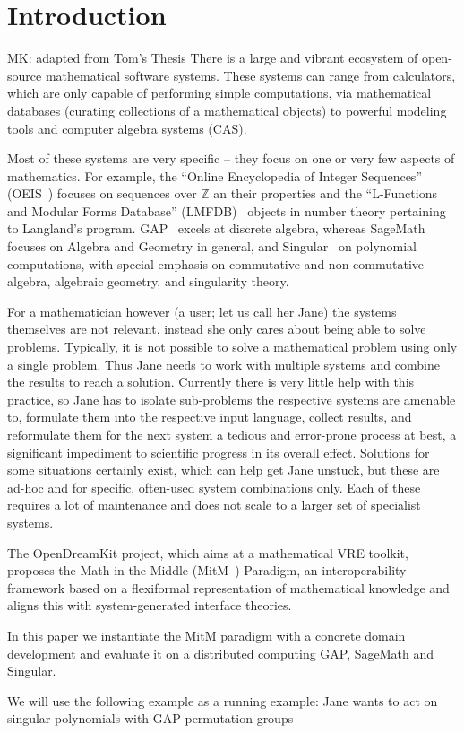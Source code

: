 \section{Introduction}\label{sec:intro}

\begin{newpart}{MK: adapted from Tom's Thesis}
There is a large and vibrant ecosystem of open-source mathematical software systems.
These systems can range from calculators, which are only capable of performing simple
computations, via mathematical databases (curating collections of a mathematical objects)
to powerful modeling tools and computer algebra systems (CAS). 

Most of these systems are very specific -- they focus on one or very few aspects of
mathematics.  For example, the ``Online Encyclopedia of Integer Sequences''
(OEIS~\cite{Sloane:oeis12,oeis}) focuses on sequences over $\mathbb{Z}$ an their
properties and the ``L-Functions and Modular Forms Database''
(LMFDB)~\cite{Cremona:LMFDB16,lmfdb:on} objects in number theory pertaining to Langland's
program.  GAP~\cite{GAP:on} excels at discrete algebra, whereas
SageMath~\cite{SageMath:on} focuses on Algebra and Geometry in general, and
Singular~\cite{singular:on} on polynomial computations, with special emphasis on
commutative and non-commutative algebra, algebraic geometry, and singularity theory.

For a mathematician however (a user; let us call her Jane) the systems themselves are not relevant, instead she only cares about being able to solve problems. 
Typically, it is not possible to solve a mathematical problem using only a single problem. 
Thus Jane needs to work with multiple systems and combine the results to reach a solution. 
Currently there is very little help with this practice, so Jane has to isolate sub-problems the respective systems are amenable to, formulate them into the respective input language, collect results, and reformulate them for the next system a tedious and error-prone process at best, a significant impediment to scientific progress in its overall effect. 
Solutions for some situations certainly exist, which can help get Jane unstuck, but these are ad-hoc and for specific, often-used system combinations only. 
Each of these requires a lot of maintenance and does not scale to a larger set of specialist systems. 

The OpenDreamKit project, which aims at a mathematical VRE toolkit, proposes the Math-in-the-Middle (MitM~\cite{DehKohKon:iop16}) Paradigm, an interoperability framework based on a flexiformal
representation of mathematical knowledge and aligns this with system-generated interface
theories. 

In this paper we instantiate the MitM paradigm with a concrete domain development and
evaluate it on a distributed computing GAP, SageMath and Singular.

We will use the following example as a running example: Jane wants to act on singular
polynomials with GAP permutation groups

\end{newpart}

